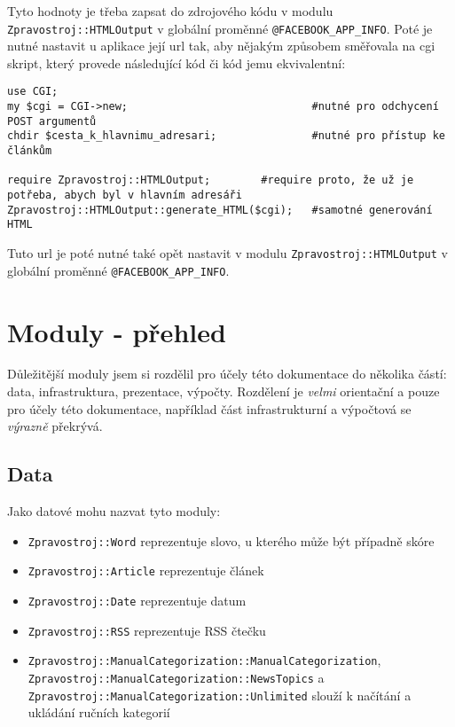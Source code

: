 \documentclass[12pt,a4paper]{report}
\begin{document}
Tyto hodnoty je třeba zapsat do zdrojového kódu v modulu \texttt{Zpravostroj::HTMLOutput} v globální proměnné \texttt{@FACEBOOK\_APP\_INFO}. Poté je nutné nastavit u aplikace její url tak, aby nějakým způsobem směřovala na cgi skript, který provede následující kód či kód jemu ekvivalentní:

\lstset{language=Perl, frame=single}
\begin{lstlisting}
use CGI;
my $cgi = CGI->new;                             #nutné pro odchycení POST argumentů
chdir $cesta_k_hlavnimu_adresari;               #nutné pro přístup ke článkům

require Zpravostroj::HTMLOutput;		#require proto, že už je potřeba, abych byl v hlavním adresáři
Zpravostroj::HTMLOutput::generate_HTML($cgi);   #samotné generování HTML
\end{lstlisting}

Tuto url je poté nutné také opět nastavit v modulu \texttt{Zpravostroj::HTMLOutput} v globální proměnné \texttt{@FACEBOOK\_APP\_INFO}.


\chapter{Moduly - přehled}

Důležitější moduly jsem si rozdělil pro účely této dokumentace do několika částí: data, infrastruktura, prezentace, výpočty. Rozdělení je \emph{velmi} orientační a pouze pro účely této dokumentace, například část infrastrukturní a výpočtová se \emph{výrazně} překrývá.

\section{Data}
Jako datové mohu nazvat tyto moduly:

\begin{itemize}
	\item \texttt{Zpravostroj::Word} reprezentuje slovo, u kterého může být případně skóre
	\item \texttt{Zpravostroj::Article} reprezentuje článek
	\item \texttt{Zpravostroj::Date} reprezentuje datum
	\item \texttt{Zpravostroj::RSS} reprezentuje RSS čtečku
	\item \texttt{Zpravostroj::ManualCategorization::ManualCategorization}, \texttt{Zpravostroj::ManualCategorization::NewsTopics} a \texttt{Zpravostroj::ManualCategorization::Unlimited} slouží k načítání a ukládání ručních kategorií
	
\end{itemize}	
\end{document}

